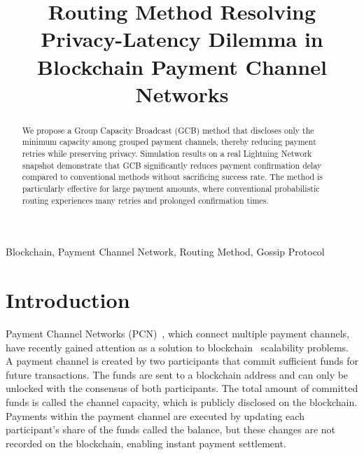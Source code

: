 \documentclass[conference]{IEEEtran}
\begin{document}
\title{Routing Method Resolving Privacy-Latency Dilemma in Blockchain Payment Channel Networks}

\author{
	\and
}

\maketitle

\begin{abstract}
	We propose a Group Capacity Broadcast (GCB) method that discloses only the minimum capacity among grouped payment channels, thereby reducing payment retries while preserving privacy.
	Simulation results on a real Lightning Network snapshot demonstrate that GCB significantly reduces payment confirmation delay compared to conventional methods without sacrificing success rate.
	The method is particularly effective for large payment amounts, where conventional probabilistic routing experiences many retries and prolonged confirmation times.
\end{abstract}

\begin{IEEEkeywords}
	Blockchain, Payment Channel Network, Routing Method, Gossip Protocol
\end{IEEEkeywords}

\section{Introduction}

Payment Channel Networks (PCN)~\cite{poon_dryja_2016}, which connect multiple payment channels, have recently gained attention as a solution to blockchain~\cite{nakamoto2008bitcoin} scalability problems.
A payment channel is created by two participants that commit sufficient funds for future transactions.
The funds are sent to a blockchain address and can only be unlocked with the consensus of both participants.
The total amount of committed funds is called the channel capacity, which is publicly disclosed on the blockchain.
Payments within the payment channel are executed by updating each participant's share of the funds called the balance, but these changes are not recorded on the blockchain, enabling instant payment settlement.
\end{document}
